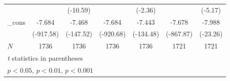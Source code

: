 {\begin{tabular}{l*{6}{c}}
            &                     &    (-10.59)         &                     &     (-2.36)         &                     &     (-5.17)         \\
[1em]
\_cons      &      -7.684\sym{***}&      -7.468\sym{***}&      -7.684\sym{***}&      -7.443\sym{***}&      -7.678\sym{***}&      -7.988\sym{***}\\
            &   (-917.58)         &   (-147.52)         &   (-920.68)         &   (-134.48)         &   (-867.87)         &    (-23.26)         \\
\hline
\(N\)       &        1736         &        1736         &        1736         &        1736         &        1721         &        1721         \\
\hline\hline
\multicolumn{7}{l}{\footnotesize \textit{t} statistics in parentheses}\\
\multicolumn{7}{l}{\footnotesize \sym{*} \(p<0.05\), \sym{**} \(p<0.01\), \sym{***} \(p<0.001\)}\\
\end{tabular}
}
